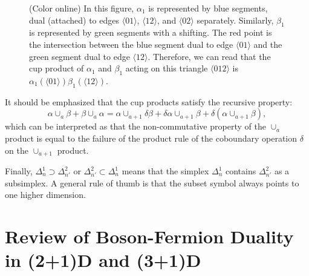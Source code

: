 \documentclass[12pt]{article}
\newcommand{\lr}[1]{{\langle {#1}\rangle}}
\begin{document}
\begin{figure}[htb]
\centering
{}
\caption{(Color online) In this figure, $\alpha_1$ is represented by blue segments, dual (attached) to edges $\lr{01}$, $\lr{12}$, and $\lr{02}$ separately. Similarly, $\beta_1$ is represented by green segments with a shifting. The red point is the intersection between the blue segment dual to edge $\lr{01}$ and the green segment dual to edge $\lr{12}$. Therefore, we can read that the cup product of $\alpha_1$ and $\beta_1$ acting on this triangle $\lr{012}$ is $ \alpha_1 (\lr{01}) \beta_1(\lr{12})$.}
\label{fig: cup product}
\end{figure}

It should be emphasized that the cup products satisfy the recursive property:
\begin{equation}
    \alpha \cup_a \beta + \beta \cup_a \alpha = \alpha \cup_{a+1} \delta \beta + \delta \alpha \cup_{a+1} \beta + \delta (\alpha \cup_{a+1} \beta),
\label{eq: recursive property of cup products}
\end{equation}
which can be interpreted as that the non-commutative property of the $\cup_a$ product is equal to the failure of the product rule of the coboundary operation $\delta$ on the $\cup_{a+1}$ product.



Finally, $\Delta^1_n \supset \Delta^2_{n'}$ or $\Delta^2_{n'}\subset \Delta^1_n $ means that the simplex $\Delta^1_n$ contains $\Delta^2_{n'}$ as a subsimplex. A general rule of thumb is that the subset symbol always points to one higher dimension.

\section{Review of Boson-Fermion Duality in (2+1)D and (3+1)D}
\end{document}
